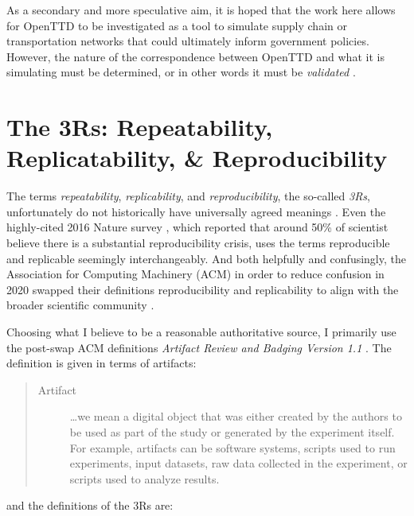 \documentclass[logo,msc,dsti]{infthesis}    %
\begin{document}
As a secondary and more speculative aim, it is hoped that the work here allows for OpenTTD to be investigated as a tool to simulate supply chain or transportation networks that could ultimately inform government policies. However, the nature of the correspondence between OpenTTD and what it is simulating must be determined, or in other words it must be \emph{validated} \cite{doi:10.1177/1046878198291003}.

\section{The 3Rs: Repeatability, Replicatability, \& Reproducibility}
\label{section:define-3rs}

The terms \emph{repeatability}, \emph{replicability}, and \emph{reproducibility}, the so-called \emph{3Rs}, unfortunately do not historically have universally agreed meanings \cite{plesser_reproducibility_2018}. Even the highly-cited 2016 Nature survey \cite{baker20161}, which reported that around 50\% of scientist believe there is a substantial reproducibility crisis, uses the terms reproducible and replicable seemingly interchangeably. And both helpfully and confusingly, the Association for Computing Machinery (ACM) in order to reduce confusion in 2020 swapped their definitions reproducibility and replicability to align with the broader scientific community \cite{association_for_computing_machiner_new_2020}.

Choosing what I believe to be a reasonable authoritative source, I primarily use the post-swap ACM definitions \emph{Artifact Review and Badging Version 1.1} \cite{association_for_computing_machiner_artifact_2020}. The definition is given in terms of artifacts:

\begin{quote}
\begin{description}
\item[Artifact]

\ldots we mean a digital object that was either created by the authors to be used as part of the study or generated by the experiment itself. For example, artifacts can be software systems, scripts used to run experiments, input datasets, raw data collected in the experiment, or scripts used to analyze results.
\end{description}
\end{quote}
and the definitions of the 3Rs are:
\end{document}

